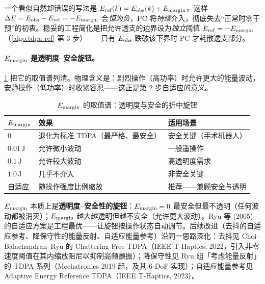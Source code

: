 \begin{pitfall}[别令 $E_{\rm ref}=E_{\rm obs}+E_{\rm margin}$]
一个看似自然却错误的写法是 $E_{\rm ref}(k)=E_{\rm obs}(k)+E_{\rm margin}$。这样 $\Delta E=E_{\rm obs}-E_{\rm ref}=-E_{\rm margin}$ 会\emph{恒为负}，PC 将\emph{持续}介入，彻底失去“正常时零干预”的初衷。稳妥的工程简化是把允许透支的边界设为\emph{独立}阈值 $E_{\rm ref}=-E_{\rm margin}$（\cref{algo:tdpa-ref} 第 3 步）——只有 $E_{\rm obs}$ 跌破该下界时 PC 才耗散透支部分。
\end{pitfall}

\paragraph{$E_{\rm margin}$ 是透明度–安全旋钮。}
\cref{tab:tdpa-margin} 把它的取值谱列清。物理含义是：剧烈操作（高功率）时允许更大的能量波动，安静操作（低功率）时收紧容忍——这正是第 2 步自适应的意义。

\begin{table}[H]\centering\small
\caption{$E_{\rm margin}$ 的取值谱：透明度与安全的折中旋钮}
\label{tab:tdpa-margin}
\begin{tabular}{p{} p{} p{}}
\toprule
$E_{\rm margin}$ & 效果 & 适用场景 \\
\midrule
$0$ & 退化为标准 TDPA（最严格、最安全） & 安全关键（手术机器人） \\
$0.01\,\mathrm J$ & 允许微小波动 & 一般遥操作 \\
$0.1\,\mathrm J$ & 允许较大波动 & 高透明度需求 \\
$1.0\,\mathrm J$ & 几乎不介入 & 非安全关键 \\
自适应 & 随操作强度比例缩放 & 推荐——兼顾安全与透明 \\
\bottomrule
\end{tabular}
\end{table}

\begin{insight}
$E_{\rm margin}$ 本质上是\textbf{透明度–安全性的旋钮}：$E_{\rm margin}=0$ 最安全但最不透明（任何波动都被消灭）；$E_{\rm margin}$ 越大越透明但越不安全（允许更大波动）。Ryu 等 (2005) 的自适应方案是工程最优——让旋钮按操作状态自动调节。后续改进（去抖的自适应参考、降保守性的能量反射、自适应能量参考）沿同一思路深化：去抖见 Choi--Balachandran--Ryu 的 Chattering-Free TDPA（IEEE T-Haptics, 2022，引入非零速度阈值在其内缩放阻尼以抑制高频颤振）；降保守性见 Ryu 组「考虑能量反射」的 TDPA 系列（Mechatronics 2019 起，及其 6-DoF 实现）；自适应能量参考见 Adaptive Energy Reference TDPA（IEEE T-Haptics, 2023）。
\end{insight}

